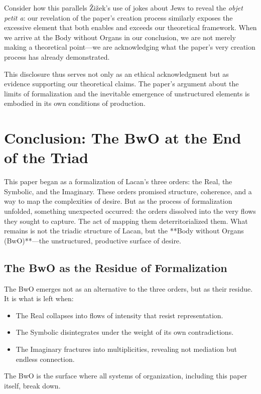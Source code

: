 \documentclass{article}
\begin{document}
Consider how this parallels \v{Z}i\v{z}ek's use of jokes about Jews to reveal the \textit{objet petit a}: our revelation of the paper's creation process similarly exposes the excessive element that both enables and exceeds our theoretical framework. When we arrive at the Body without Organs in our conclusion, we are not merely making a theoretical point---we are acknowledging what the paper's very creation process has already demonstrated.

This disclosure thus serves not only as an ethical acknowledgment but as evidence supporting our theoretical claims. The paper's argument about the limits of formalization and the inevitable emergence of unstructured elements is embodied in its own conditions of production.


\section{Conclusion: The BwO at the End of the Triad}

This paper began as a formalization of Lacan’s three orders: the Real, the Symbolic, and the Imaginary. These orders promised structure, coherence, and a way to map the complexities of desire. But as the process of formalization unfolded, something unexpected occurred: the orders dissolved into the very flows they sought to capture. The act of mapping them deterritorialized them. What remains is not the triadic structure of Lacan, but the **Body without Organs (BwO)**—the unstructured, productive surface of desire.

\subsection{The BwO as the Residue of Formalization}

The BwO emerges not as an alternative to the three orders, but as their residue. It is what is left when:
\begin{itemize}
    \item The Real collapses into flows of intensity that resist representation.
    \item The Symbolic disintegrates under the weight of its own contradictions.
    \item The Imaginary fractures into multiplicities, revealing not mediation but endless connection.
\end{itemize}

The BwO is the surface where all systems of organization, including this paper itself, break down.
\end{document}
